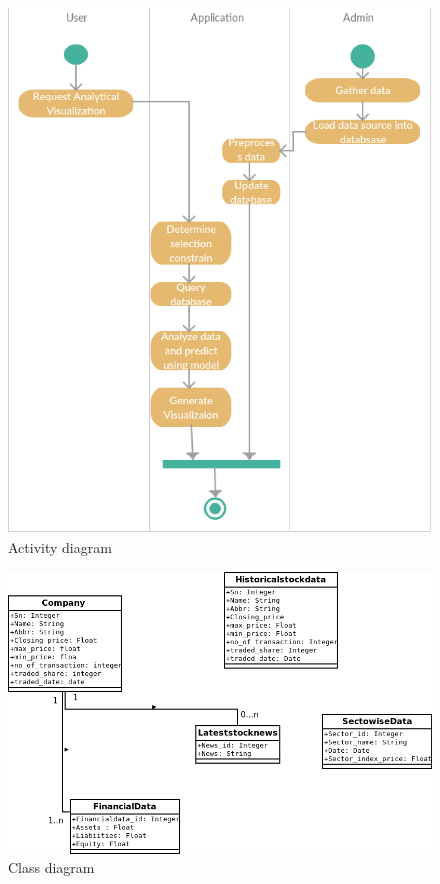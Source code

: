 \begin{figure}[H]\centering
  \includegraphics[width=6.5in]{fig/activity}
  \caption{Activity diagram}
  \label{fig:activity}
\end{figure}

\begin{figure}[H]\centering
  \includegraphics[width=6in]{fig/classdiagram}
  \caption{Class diagram}
  \label{fig:classdiagram}
\end{figure}

